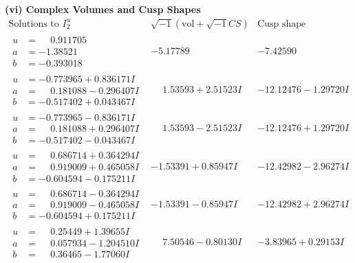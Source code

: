\documentclass[1p]{elsarticle_modified}
\theoremstyle{definition}
\newcommand{\I}{\sqrt{-1}}
\begin{document}
\newpage\flushleft \textbf{(vi) Complex Volumes and Cusp Shapes}
$$\begin{array}{c|c|c}  
\text{Solutions to }I^u_{2}& \I (\text{vol} + \sqrt{-1}CS) & \text{Cusp shape}\\
 \hline 
\begin{aligned}
u &= \phantom{-}0.911705\phantom{ +0.000000I} \\
a &= -1.38521\phantom{ +0.000000I} \\
b &= -0.393018\phantom{ +0.000000I}\end{aligned}
 & -5.17789\phantom{ +0.000000I} & -7.42590\phantom{ +0.000000I} \\ \hline\begin{aligned}
u &= -0.773965 + 0.836171 I \\
a &= \phantom{-}0.181088 - 0.296407 I \\
b &= -0.517402 + 0.043467 I\end{aligned}
 & \phantom{-}1.53593 + 2.51523 I & -12.12476 - 1.29720 I \\ \hline\begin{aligned}
u &= -0.773965 - 0.836171 I \\
a &= \phantom{-}0.181088 + 0.296407 I \\
b &= -0.517402 - 0.043467 I\end{aligned}
 & \phantom{-}1.53593 - 2.51523 I & -12.12476 + 1.29720 I \\ \hline\begin{aligned}
u &= \phantom{-}0.686714 + 0.364294 I \\
a &= \phantom{-}0.919009 + 0.465058 I \\
b &= -0.604594 - 0.175211 I\end{aligned}
 & -1.53391 + 0.85947 I & -12.42982 - 2.96274 I \\ \hline\begin{aligned}
u &= \phantom{-}0.686714 - 0.364294 I \\
a &= \phantom{-}0.919009 - 0.465058 I \\
b &= -0.604594 + 0.175211 I\end{aligned}
 & -1.53391 - 0.85947 I & -12.42982 + 2.96274 I \\ \hline\begin{aligned}
u &= \phantom{-}0.25449 + 1.39655 I \\
a &= \phantom{-}0.057934 - 1.204510 I \\
b &= \phantom{-}0.36465 - 1.77060 I\end{aligned}
 & \phantom{-}7.50546 - 0.80130 I & -3.83965 + 0.29153 I \\ \hline\begin{aligned}

\end{aligned}
\end{array}$$
\end{document}
